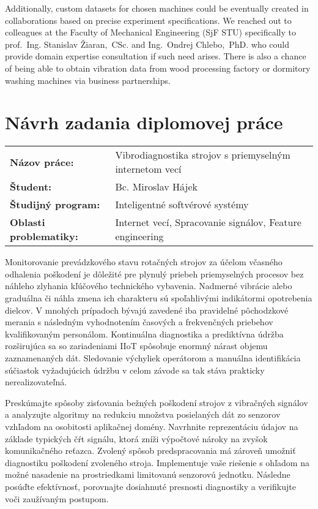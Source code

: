 \documentclass[11pt, a4paper, english]{article}
\newcommand{\Title}[0] {Vibrodiagnostika strojov s priemyselným internetom vecí}
\newcommand{\Author}[0] {Bc. Miroslav Hájek}
\begin{document}
\begin{refsection}
Additionally, custom datasets for chosen machines could be eventually created in collaborations based on precise experiment specifications. We reached out to colleagues at the Faculty of Mechanical Engineering (SjF STU) specifically to prof.~Ing. Stanislav Žiaran,~CSc. and Ing.~Ondrej Chlebo,~PhD. who could provide domain expertise consultation if such need arises. There is also a chance of being able to obtain vibration data from wood processing factory or dormitory washing machines via business partnerships.

\newpage
\printbibliography[title={Literature}, keyword=important]
\end{refsection}

\newpage
{}
\section*{Návrh zadania diplomovej práce}
\begin{longtable}{l l}
\textbf{Názov práce:} & \Title \\
\textbf{Študent:}     & \Author \\
\textbf{Študijný program:} &  Inteligentné softvérové systémy \\
\textbf{Oblasti problematiky:} &  Internet vecí, Spracovanie signálov, Feature engineering \\
\end{longtable}

\small{
Monitorovanie prevádzkového stavu rotačných strojov za účelom včasného odhalenia poškodení je dôležité pre plynulý priebeh priemyselných procesov bez náhleho zlyhania kľúčového technického vybavenia. Nadmerné vibrácie alebo graduálna či náhla zmena ich charakteru sú spoľahlivými indikátormi opotrebenia dielcov. V mnohých prípadoch bývajú zavedené iba pravidelné pôchodzkové merania s následným vyhodnotením časových a frekvenčných priebehov kvalifikovaným personálom. Kontinuálna diagnostika a prediktívna údržba rozširujúca sa so zariadeniami IIoT spôsobuje enormný nárast objemu zaznamenaných dát. Sledovanie výchyliek operátorom a manuálna identifikácia súčiastok vyžadujúcich údržbu v celom závode sa tak stáva prakticky nerealizovateľná.

Preskúmajte spôsoby zisťovania bežných poškodení strojov z vibračných signálov a analyzujte algoritmy na redukciu množstva posielaných dát zo senzorov vzhľadom na osobitosti aplikačnej domény. Navrhnite reprezentáciu údajov na základe typických čŕt signálu, ktorá zníži výpočtové nároky na zvyšok komunikačného reťazca. Zvolený spôsob predspracovania má zároveň umožniť diagnostiku poškodení zvoleného stroja. Implementuje vaše riešenie s ohľadom na možné nasadenie na prostriedkami limitovanú senzorovú jednotku. Následne posúďte efektívnosť, porovnajte dosiahnuté presnosti diagnostiky a verifikujte voči zaužívaným postupom.
}

\printbibliography[
	heading=subbibliography, 
	env=bibassignment,
	title={Literatúra}, 
	keyword=assignment
]
\nocite{*}
\end{document}
